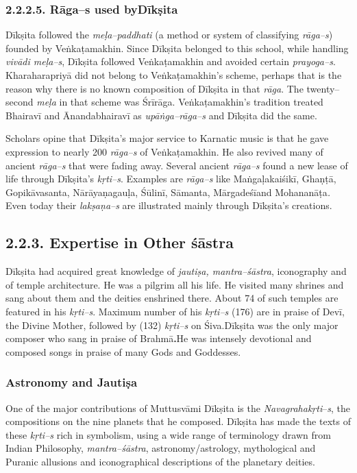 \subsubsection*{2.2.2.5. Rāga–s used byDīkṣita}

Dīkṣita followed the \textit{meḷa–paddhati} (a method or system of classifying \textit{rāga–s}) founded by Veṅkaṭamakhin. Since Dīkṣita belonged to this school, while handling \textit{vivādi meḷa–s}, Dīkṣita followed Veṅkaṭamakhin and avoided certain \textit{prayoga–s}. Kharaharapriyā did not belong to Veṅkaṭamakhin’s scheme, perhaps that is the reason why there is no known composition of Dīkṣita in that \textit{rāga}. The twenty–second \textit{meḷa} in that scheme was Śrīrāga. Veṅkaṭamakhin’s tradition treated Bhairavī and Ānandabhairavī as \textit{upāṅga–rāga–s} and Dīkṣita did the same.

Scholars opine that Dīkṣita’s major service to Karnatic music is that he gave expression to nearly 200 \textit{rāga–s} of Veṅkaṭamakhin. He also revived many of ancient \textit{rāga–s} that were fading away. Several ancient \textit{rāga–s} found a new lease of life through Dīkṣita’s \textit{kṛti–s}. Examples are \textit{rāga–s} like Maṅgaḷakaiśikī, Ghaṇṭā, Gopikāvasanta, Nārāyaṇagauḷa, Śūlinī, Sāmanta, Mārgadeśīand Mohananāṭa\textit{. }Even today their \textit{lakṣaṇa–s} are illustrated mainly through Dīkṣita’s creations.


\subsection*{2.2.3. Expertise in Other śāstra}

Dīkṣita had acquired great knowledge of \textit{jautiṣa, mantra–śāstra}, iconography and of temple architecture. He was a pilgrim all his life. He visited many shrines and sang about them and the deities enshrined there. About 74 of such temples are featured in his \textit{kṛti–s}. Maximum number of his \textit{kṛti–s} (176) are in praise of Devī, the Divine Mother, followed by (132) \textit{kṛti–s} on Śiva.Dīkṣita was the only major composer who sang in praise of Brahmā\textbf{.}He was intensely devotional and composed songs in praise of many Gods and Goddesses.

\subsubsection*{Astronomy and Jautiṣa}

One of the major contributions of Muttusvāmi Dīkṣita is the \textit{Navagrahakṛti}–\textit{s}, the compositions on the nine planets that he composed. Dīkṣita has made the texts of these \textit{kṛti–s} rich in symbolism, using a wide range of terminology drawn from Indian Philosophy, \textit{mantra–śāstra}, astronomy/astrology, mythological and Puranic allusions and iconographical descriptions of the planetary deities.

